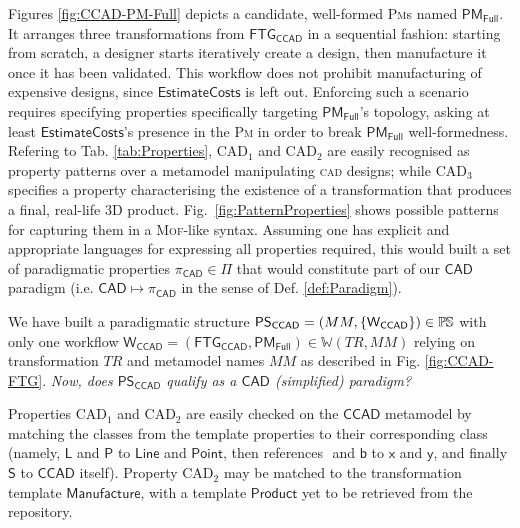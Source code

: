 Figures \ref{fig:CCAD-PM-Full} depicts a candidate, well-formed \textsc{Pm}s 
named $\mathsf{PM_{Full}}$.
It arranges three transformations from $\mathsf{FTG_{CCAD}}$ in a sequential 
fashion: starting from scratch, a designer starts iteratively create a
design, then manufacture it once it has been validated. This workflow does not 
prohibit manufacturing of expensive designs, since $\mathsf{EstimateCosts}$ is 
left out.
Enforcing such a scenario requires specifying properties specifically targeting 
$\mathsf{PM_{Full}}$'s topology, asking at least $\mathsf{EstimateCosts}$'s 
presence in the \textsc{Pm} in order to break $\mathsf{PM_{Full}}$ 
well-formedness.
%
Refering to Tab. \ref{tab:Properties}, $\mbox{CAD}_1$ and $\mbox{CAD}_2$ are 
easily recognised as property 
patterns over a metamodel manipulating \textsc{cad} designs; while 
$\mbox{CAD}_3$ specifies a property characterising the existence of a 
transformation that produces a final, real-life 3D product. Fig.~\ref{fig:PatternProperties} 
shows possible patterns for capturing them in a 
\textsc{Mof}-like syntax. Assuming one has explicit and appropriate languages 
for expressing all properties required, this would built a set of 
paradigmatic properties $\pi_{\mathsf{CAD}}\in\Pi$ that would constitute part of 
our $\mathsf{CAD}$ paradigm (i.e. $\mathsf{CAD} \mapsto \pi_{\mathsf{CAD}}$ in 
the sense of Def. \ref{def:Paradigm}).


We have built a paradigmatic structure $\mathsf{PS_{CCAD}} = (MM, 
\{\mathsf{W_{CCAD}}\})\in\mathbb{P}\mskip-1mu\mathbb{S}$ with only one workflow $\mathsf{W_{CCAD}} = 
(\mathsf{FTG_{CCAD}}, \mathsf{PM_{Full}})\in\mathbb{W}(TR, MM)$ relying on 
transformation $TR$ and metamodel names $MM$ as described in Fig. 
\ref{fig:CCAD-FTG}. \emph{Now, does $\mathsf{PS_{CCAD}}$ qualify as a 
$\mathsf{CAD}$ (simplified) paradigm?}

Properties $\mbox{CAD}_1$ and $\mbox{CAD}_2$ are easily checked on the 
$\mathsf{CCAD}$ metamodel by matching the classes from the template properties 
to their corresponding class (namely, $\mathsf{L}$ and $\mathsf{P}$ to 
$\mathsf{Line}$ and $\mathsf{Point}$, then references $\mathsf{}$ and 
$\mathsf{b}$ to $\mathsf{x}$ and $\mathsf{y}$, and finally $\mathsf{S}$ to 
$\mathsf{CCAD}$ itself). Property $\mbox{CAD}_2$ may be matched to the 
transformation template $\mathsf{Manufacture}$, with a template 
$\mathsf{Product}$ yet to be retrieved from the repository.  

